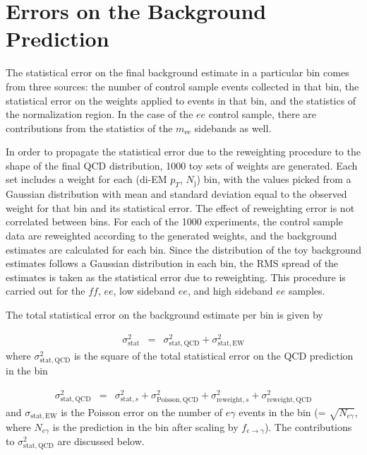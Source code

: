\documentclass[dissertation_bw.tex]{subfiles}
\begin{document}
\section{Errors on the Background Prediction}
\label{sec:Errors on the Background Prediction}

The statistical error on the final background estimate in a particular \MET bin comes from three sources: the number of control sample events collected in that bin, the statistical error on the weights applied to events in that bin, and the statistics of the normalization region.  In the case of the $ee$ control sample, there are contributions from the statistics of the $m_{\mathrm{ee}}$ sidebands as well.

In order to propagate the statistical error due to the reweighting procedure to the shape of the final QCD \MET distribution, 1000 toy sets of weights are generated.  Each set includes a weight for each (di-EM $p_{T}$, $N_{\mathrm{j}}$) bin, with the values picked from a Gaussian distribution with mean and standard deviation equal to the observed weight for that bin and its statistical error.  The effect of reweighting error is not correlated between \MET bins.  For each of the 1000 experiments, the control sample data are reweighted according to the generated weights, and the background estimates are calculated for each \MET bin.  Since the distribution of the toy background estimates follows a Gaussian distribution in each \MET bin, the RMS spread of the estimates is taken as the statistical error due to reweighting.  This procedure is carried out for the $\mathit{ff}$, $ee$, low sideband $ee$, and high sideband $ee$ samples.

The total statistical error on the background estimate per \MET bin is given by

\begin{eqnarray}
\sigma_{\mathrm{stat}}^{2} &=& \sigma_{\mathrm{stat,QCD}}^{2} + \sigma_{\mathrm{stat,EW}}^{2}
\label{eq:total_stat_error}
\end{eqnarray}
%
where $\sigma_{\mathrm{stat,QCD}}^{2}$ is the square of the total statistical error on the QCD prediction in the \MET bin

\begin{eqnarray}
\sigma_{\mathrm{stat,QCD}}^{2} &=& \sigma_{\mathrm{stat,}s}^{2} + \sigma_{\mathrm{Poisson,QCD}}^{2} + \sigma_{\mathrm{reweight,}s}^{2} + \sigma_{\mathrm{reweight,QCD}}^{2}
\label{eq:QCD_stat_error}
\end{eqnarray}
%
and $\sigma_{\mathrm{stat,EW}}$ is the Poisson error on the number of $e\gamma$ events in the \MET bin (= $\sqrt{N_{e\gamma}}$, where $N_{e\gamma}$ is the prediction in the \MET bin after scaling by $f_{e\rightarrow\gamma}$).  The contributions to $\sigma_{\mathrm{stat,QCD}}^{2}$ are discussed below.
\end{document}
